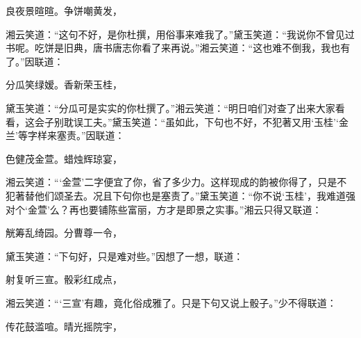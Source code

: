 \begin{poem}
    \begin{pl}
        良夜景暄暄。争饼嘲黄发，
    \end{pl}
\end{poem}
\begin{parag}
    湘云笑道：“这句不好，是你杜撰，用俗事来难我了。”黛玉笑道：“我说你不曾见过书呢。吃饼是旧典，唐书唐志你看了来再说。”湘云笑道：“这也难不倒我，我也有了。”因联道：
\end{parag}


\begin{poem}
    \begin{pl}
        分瓜笑绿嫒。香新荣玉桂，
    \end{pl}
\end{poem}
\begin{parag}
    黛玉笑道：“分瓜可是实实的你杜撰了。”湘云笑道：“明日咱们对查了出来大家看看，这会子别耽误工夫。”黛玉笑道：“虽如此，下句也不好，不犯著又用‘玉桂’‘金兰’等字样来塞责。”因联道：
\end{parag}


\begin{poem}
    \begin{pl}
        色健茂金萱。蜡烛辉琼宴，
    \end{pl}
\end{poem}
\begin{parag}
    湘云笑道：“‘金萱’二字便宜了你，省了多少力。这样现成的韵被你得了，只是不犯著替他们颂圣去。况且下句你也是塞责了。”黛玉笑道：“你不说‘玉桂’，我难道强对个‘金萱’么？再也要铺陈些富丽，方才是即景之实事。”湘云只得又联道：
\end{parag}


\begin{poem}
    \begin{pl}
        觥筹乱绮园。分曹尊一令，
    \end{pl}
\end{poem}
\begin{parag}
    黛玉笑道：“下句好，只是难对些。”因想了一想，联道：
\end{parag}
\begin{poem}
    \begin{pl}
        射复听三宣。骰彩红成点，

    \end{pl}
\end{poem}
\begin{parag}
    湘云笑道：“‘三宣’有趣，竟化俗成雅了。只是下句又说上骰子。”少不得联道：
\end{parag}
\begin{poem}
    \begin{pl}

        传花鼓滥喧。晴光摇院宇，

    \end{pl}
\end{poem}

